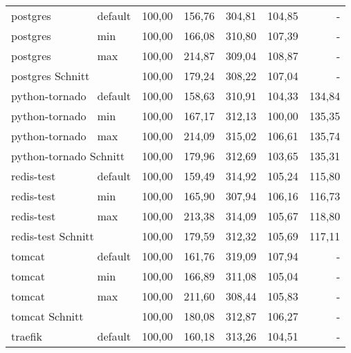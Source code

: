 \begin{footnotesize}
\begin{longtable}{llrrrrr}
		postgres                 & default         & 100,00 & 156,76 & 304,81  & 104,85                         & -      \\
		postgres                 & min             & 100,00 & 166,08 & 310,80  & 107,39                         & -      \\
		postgres                 & max             & 100,00 & 214,87 & 309,04  & 108,87                         & -      \\ \hline
		\multicolumn{2}{l}{postgres Schnitt}       & 100,00 & 179,24 & 308,22  & 107,04                         & -      \\ \hline
		python-tornado           & default         & 100,00 & 158,63 & 310,91  & 104,33                         & 134,84 \\
		python-tornado           & min             & 100,00 & 167,17 & 312,13  & \cellcolor[HTML]{C0C0C0}100,00 & 135,35 \\
		python-tornado           & max             & 100,00 & 214,09 & 315,02  & 106,61                         & 135,74 \\ \hline
		\multicolumn{2}{l}{python-tornado Schnitt} & 100,00 & 179,96 & 312,69  & 103,65                         & 135,31 \\ \hline
		redis-test               & default         & 100,00 & 159,49 & 314,92  & 105,24                         & 115,80 \\
		redis-test               & min             & 100,00 & 165,90 & 307,94  & 106,16                         & 116,73 \\
		redis-test               & max             & 100,00 & 213,38 & 314,09  & 105,67                         & 118,80 \\ \hline
		\multicolumn{2}{l}{redis-test Schnitt}     & 100,00 & 179,59 & 312,32  & 105,69                         & 117,11 \\ \hline
		tomcat                   & default         & 100,00 & 161,76 & 319,09  & 107,94                         & -      \\
		tomcat                   & min             & 100,00 & 166,89 & 311,08  & 105,04                         & -      \\
		tomcat                   & max             & 100,00 & 211,60 & 308,44  & 105,83                         & -      \\ \hline
		\multicolumn{2}{l}{tomcat Schnitt}         & 100,00 & 180,08 & 312,87  & 106,27                         & -      \\ \hline
		traefik                  & default         & 100,00 & 160,18 & 313,26  & 104,51                         & -      \\

\end{longtable}
\end{footnotesize}
